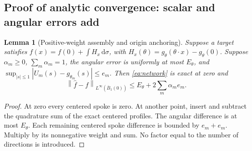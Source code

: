\documentclass[11pt,letterpaper]{article}
\newcommand{\dd}{\,\mathrm d}
\newcommand{\norm}[1]{\left\lVert#1\right\rVert}
\newcommand{\Ball}{\overline B_1(0)}
\newtheorem{lemma}{Lemma}[section]
\theoremstyle{definition}
\theoremstyle{remark}
\begin{document}
\subsection{Proof of analytic convergence: scalar and angular errors add}
\begin{lemma}[Positive-weight assembly and origin anchoring]\label{lem:assembly}
Suppose a target satisfies
\(f(x)=f(0)+\int H_x\dd\sigma\), with
\(H_x(\theta)=g_\theta(\theta\cdot x)-g_\theta(0)\).
Suppose \(\alpha_m\ge0\), \(\sum_m\alpha_m=1\), the angular error is uniformly
at most \(E_\theta\), and
\(\sup_{|s|\le1}|U_m(s)-g_{\theta_m}(s)|\le e_m\).
Then \eqref{eq:network} is exact at zero and
\begin{equation}\label{eq:assembly}
 \norm{\widehat f-f}_{L^\infty(\Ball)}
       \le E_\theta+2\sum_m\alpha_me_m.
\end{equation}
\end{lemma}
\begin{proof}
At zero every centered spoke is zero. At another point, insert and subtract
the quadrature sum of the exact centered profiles.
The angular difference is at most \(E_\theta\).
Each remaining centered spoke difference is bounded by \(e_m+e_m\).
Multiply by its nonnegative weight and sum. No factor equal to the number
of directions is introduced.
\end{proof}
\end{document}
